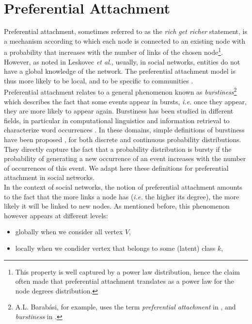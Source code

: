 \section{Preferential Attachment}
Preferential attachment, sometimes referred to as the \textit{rich get richer} statement, is a mechanism according to which each node is connected to an existing node with a probability that increases with the number of links of the chosen node\footnote{This property is well captured by a power law distribution, hence the claim often made that preferential attachment translates as a power law for the node degrees distribution.}. However, as noted in Leskovec \textit{et al.}, usually, in social networks, entities do not have a global knowledge of the network. The preferential attachment model is thus more likely to be local, and to be specific to communities \cite{LeskovecBKT08}.~\\

Preferential attachment relates to a general phenomenon known as \textit{burstiness}\footnote{A.L. Barab\'asi, for example, uses the term \textit{preferential attachment} in \cite{barabasi1999emergence}, and \textit{burstiness} in \cite{barabasi_burst}.} which describes the fact that some events appear in bursts, \textit{i.e.} once they appear, they are more likely to appear again. Burstiness has been studied in different fields, in particular in computational linguistics and information retrieval to characterize word occurrences \cite{church1995poisson}. In these domains, simple definitions of burstiness have been proposed \cite{clinchant2008bnb,clinchant2010information}, for both discrete and continuous probability distributions. They directly capture the fact that a probability distribution is bursty if the probability of generating a new occurrence of an event increases with the number of occurrences of this event. We adapt here these definitions for preferential attachment in social networks.~\\

In the context of social networks, the notion of preferential attachment amounts to the fact that the more links a node has (\textit{i.e.} the higher its degree), the more likely it will be linked to new nodes. As mentioned before, this phenomenon however appears at different levels: 
\begin{itemize}
    \item globally when we consider all vertex $V$,
    \item locally when we condider vertex that belongs to some (latent) class $k$,
\end{itemize}


